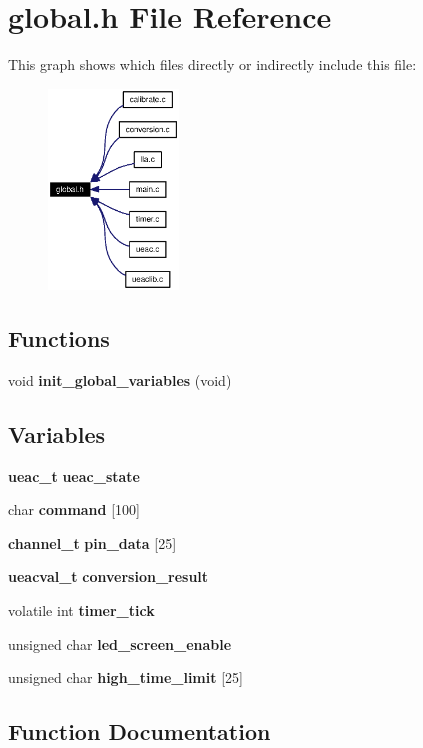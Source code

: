 \section{global.h File Reference}
\label{global_8h}


This graph shows which files directly or indirectly include this file:\begin{figure}[H]
\begin{center}
\leavevmode
\includegraphics[width=98pt]{global_8h__dep__incl}
\end{center}
\end{figure}
\subsection*{Functions}
\begin{CompactItemize}
\item 
void {\bf init\_\-global\_\-variables} (void)
\end{CompactItemize}
\subsection*{Variables}
\begin{CompactItemize}
\item 
{\bf ueac\_\-t} {\bf ueac\_\-state}
\item 
char {\bf command} [100]
\item 
{\bf channel\_\-t} {\bf pin\_\-data} [25]
\item 
{\bf ueacval\_\-t} {\bf conversion\_\-result}
\item 
volatile int {\bf timer\_\-tick}
\item 
unsigned char {\bf led\_\-screen\_\-enable}
\item 
unsigned char {\bf high\_\-time\_\-limit} [25]
\end{CompactItemize}


\subsection{Function Documentation}
